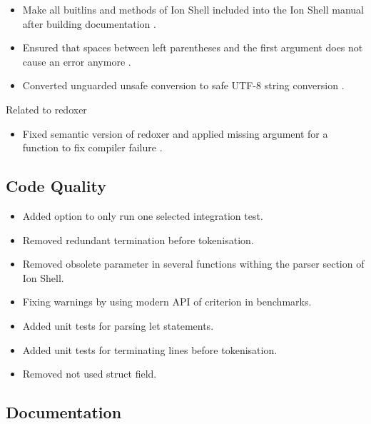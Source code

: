 \begin{itemize}
	\item Make all buitlins and methods of Ion Shell included into the Ion Shell manual after building documentation \cite{pr_man_history_included_ion_manual}.
	\item Ensured that spaces between left parentheses and the first argument does not cause an error anymore \cite{pr_fix_space_before_first_paranthese}.
	\item Converted unguarded unsafe conversion to safe UTF-8 string conversion \cite{pr_unsave_utf8_removal}.
\end{itemize}

Related to \gls{redoxer}

\begin{itemize}
	\item Fixed semantic version of \gls{redoxer} and applied missing argument for a function to fix compiler failure \cite{pr_bump_fix_redoxer}.
\end{itemize}

\subsection{Code Quality}
\label{accomplishment_code_quality}

\begin{itemize}
	\item Added option to only run one selected integration test. \cite{pr_single_test_selectable}
	\item Removed redundant termination before tokenisation. \cite{pr_removed_redundant_termination}
	\item Removed obsolete parameter in several functions withing the parser section of Ion Shell. \cite{pr_remove_not_needed_parameter}
	\item Fixing warnings by using modern API of criterion in benchmarks. \cite{pr_fix_warnings_deprecated_criterion_api}
	\item Added unit tests for parsing let statements. \cite{pr_added_unit_test_let_grammar}
	\item Added unit tests for terminating lines before tokenisation. \cite{pr_test_terminator_todos}
	\item Removed not used struct field. \cite{pr_removed_flag_undead_code}
\end{itemize}

\subsection{Documentation}\label{accomblishment_docs}

